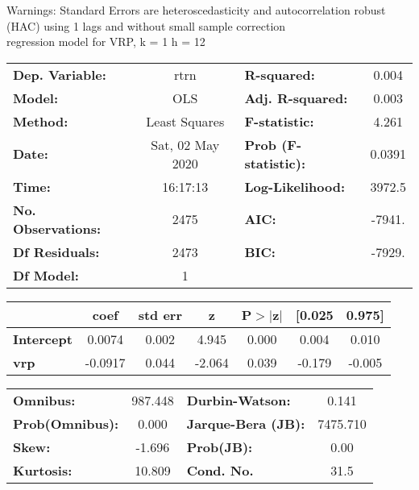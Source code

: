 Warnings: \newline
 [1] Standard Errors are heteroscedasticity and autocorrelation robust (HAC) using 1 lags and without small sample correction\\ 

regression model for VRP, k = 1 h = 12\begin{center}
\begin{tabular}{lclc}
\toprule
\textbf{Dep. Variable:}    &       rtrn       & \textbf{  R-squared:         } &     0.004   \\
\textbf{Model:}            &       OLS        & \textbf{  Adj. R-squared:    } &     0.003   \\
\textbf{Method:}           &  Least Squares   & \textbf{  F-statistic:       } &     4.261   \\
\textbf{Date:}             & Sat, 02 May 2020 & \textbf{  Prob (F-statistic):} &   0.0391    \\
\textbf{Time:}             &     16:17:13     & \textbf{  Log-Likelihood:    } &    3972.5   \\
\textbf{No. Observations:} &        2475      & \textbf{  AIC:               } &    -7941.   \\
\textbf{Df Residuals:}     &        2473      & \textbf{  BIC:               } &    -7929.   \\
\textbf{Df Model:}         &           1      & \textbf{                     } &             \\
\bottomrule
\end{tabular}
\begin{tabular}{lcccccc}
                   & \textbf{coef} & \textbf{std err} & \textbf{z} & \textbf{P$> |$z$|$} & \textbf{[0.025} & \textbf{0.975]}  \\
\midrule
\textbf{Intercept} &       0.0074  &        0.002     &     4.945  &         0.000        &        0.004    &        0.010     \\
\textbf{vrp}       &      -0.0917  &        0.044     &    -2.064  &         0.039        &       -0.179    &       -0.005     \\
\bottomrule
\end{tabular}
\begin{tabular}{lclc}
\textbf{Omnibus:}       & 987.448 & \textbf{  Durbin-Watson:     } &    0.141  \\
\textbf{Prob(Omnibus):} &   0.000 & \textbf{  Jarque-Bera (JB):  } & 7475.710  \\
\textbf{Skew:}          &  -1.696 & \textbf{  Prob(JB):          } &     0.00  \\
\textbf{Kurtosis:}      &  10.809 & \textbf{  Cond. No.          } &     31.5  \\
\bottomrule
\end{tabular}
\end{center}

